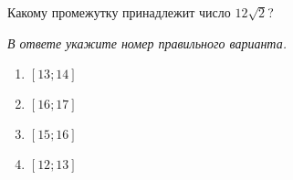 Какому промежутку принадлежит число $12\sqrt{2}$?

\textit{В ответе укажите номер правильного варианта.}
\begin{multicols}{4}
	\begin{enumerate}[label=\arabic*)]
		\item $[13;14]$
		\item $[16;17]$
		\item $[15;16]$
		\item $[12;13]$
	\end{enumerate}
\end{multicols}